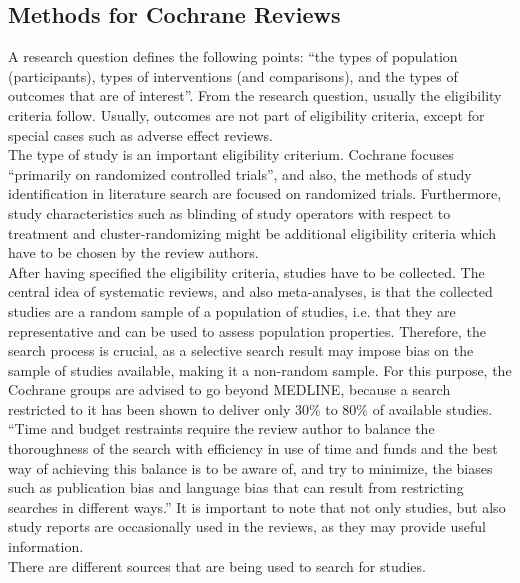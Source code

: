 \documentclass[11pt,a4paper,twoside]{book}\usepackage[]{graphicx}\usepackage[]{color}
\begin{document}
\subsection{Methods for Cochrane Reviews}
A research question defines the following points: ``the types of population (participants), types of interventions (and comparisons), and the types of outcomes that are of interest''. From the research question, usually the eligibility criteria follow. Usually, outcomes are not part of eligibility criteria, except for special cases such as adverse effect reviews. \\
The type of study is an important eligibility criterium. Cochrane focuses ``primarily on randomized controlled trials'', and also, the methods of study identification in literature search are focused on randomized trials. Furthermore, study characteristics such as blinding of study operators with respect to treatment and cluster-randomizing might be additional eligibility criteria which have to be chosen by the review authors. \\
After having specified the eligibility criteria, studies have to be collected. The central idea of systematic reviews, and also meta-analyses, is that the collected studies are a random sample of a population of studies, i.e. that they are representative and can be used to assess population properties. Therefore, the search process is crucial, as a selective search result may impose bias on the sample of studies available, making it a non-random sample. For this purpose, the Cochrane groups are advised to go beyond MEDLINE, because a search restricted to it has been shown to deliver only 30\% to 80\% of available studies. ``Time and budget restraints require the review author to balance the thoroughness of the search with efficiency in use of time and funds and the best way of achieving this balance is to be aware of, and try to minimize, the biases such as publication bias and language bias that can result from restricting searches in different ways.'' It is important to note that not only studies, but also study reports are occasionally used in the reviews, as they may provide useful information. \\
There are different sources that are being used to search for studies.
\end{document}

